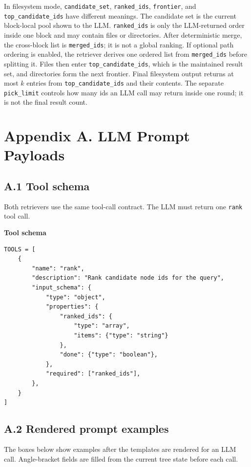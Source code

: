 \documentclass{article}
\begin{document}
In filesystem mode, \texttt{candidate\_set}, \texttt{ranked\_ids},
\texttt{frontier}, and \texttt{top\_candidate\_ids} have different meanings.
The candidate set is the current block-local pool shown to the LLM.
\texttt{ranked\_ids} is only the LLM-returned order inside one block and may
contain files or directories. After deterministic merge, the cross-block list is
\texttt{merged\_ids}; it is not a global ranking. If optional path ordering is
enabled, the retriever derives one ordered list from \texttt{merged\_ids} before
splitting it. Files then enter \texttt{top\_candidate\_ids}, which is the
maintained result set, and directories form the next frontier. Final filesystem
output returns at most $k$ entries from \texttt{top\_candidate\_ids} and their
contents. The separate \texttt{pick\_limit} controls how many ids an LLM call may
return inside one round; it is not the final result count.

\newpage

\section*{Appendix A. LLM Prompt Payloads}

\subsection*{A.1 Tool schema}

Both retrievers use the same tool-call contract. The LLM must return one
\texttt{rank} tool call.

\noindent\textbf{Tool schema}
\begin{lstlisting}
TOOLS = [
    {
        "name": "rank",
        "description": "Rank candidate node ids for the query",
        "input_schema": {
            "type": "object",
            "properties": {
                "ranked_ids": {
                    "type": "array",
                    "items": {"type": "string"}
                },
                "done": {"type": "boolean"},
            },
            "required": ["ranked_ids"],
        },
    }
]
\end{lstlisting}

\subsection*{A.2 Rendered prompt examples}

The boxes below show examples after the templates are rendered for an LLM call.
Angle-bracket fields are filled from the current tree state before each call.
\end{document}
